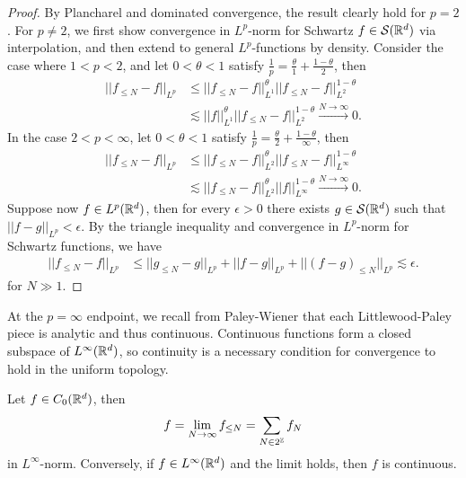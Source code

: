 \begin{proof}
	By Plancharel and dominated convergence, the result clearly hold for $p = 2$. For $p \neq 2$, we first show convergence in $L^p$-norm for Schwartz $f \in \mathcal S (\mathbb R^d)$ via interpolation, and then extend to general $L^p$-functions by density. Consider the case where $1 < p < 2$, and let $0 < \theta < 1$ satisfy $\tfrac1p = \tfrac{\theta}{1} + \tfrac{1 - \theta}{2}$, then 
		\begin{align*}
			 ||f_{\leq N} - f||_{L^p} 
					 	&\leq ||f_{\leq N} - f||_{L^1}^\theta ||f_{\leq N} - f||_{L^2}^{1 - \theta}\\
					 	& \lesssim ||f||^\theta_{L^1}||f_{\leq N} - f||_{L^2}^{1 - \theta} \overset{N \to \infty}{\longrightarrow} 0. 
		\end{align*}
	In the case $2 < p < \infty$, let $0 < \theta < 1$ satisfy $\tfrac1p = \tfrac\theta2 + \tfrac{1 - \theta}{\infty}$, then 
				\begin{align*}
					 ||f_{\leq N} - f||_{L^p} 
					 	&\leq ||f_{\leq N} - f||_{L^2}^\theta ||f_{\leq N} - f||_{L^\infty}^{1 - \theta}\\
					 	& \lesssim ||f_{\leq N} - f||_{L^2}^{\theta}   ||f||^{1 - \theta}_{L^\infty}\overset{N \to \infty}{\longrightarrow} 0. 
				\end{align*}	
	Suppose now $f \in L^p (\mathbb R^d)$, then for every $\epsilon > 0$ there exists $g \in \mathcal S (\mathbb R^d)$ such that $||f - g||_{L^p} < \epsilon$. By the triangle inequality and convergence in $L^p$-norm for Schwartz functions, we have 
		\begin{align*}
			||f_{\leq N} - f ||_{L^p} 								&\leq || g_{\leq N} - g||_{L^p} + ||f - g||_{L^p} + ||(f - g)_{\leq N}||_{L^p}\lesssim \epsilon.
		\end{align*}		
	for $N \gg 1$. 	
\end{proof}

At the $p = \infty$ endpoint, we recall from Paley-Wiener that each Littlewood-Paley piece is analytic and thus continuous. Continuous functions form a closed subspace of $L^\infty (\mathbb R^d)$, so continuity is a necessary condition for convergence to hold in the uniform topology. 

\begin{proposition}
	Let $f \in C_0 (\mathbb R^d)$, then
		\[ f = \lim_{N \to \infty} f_{\leq N} = \sum_{N \in 2^\mathbb Z} f_N \]
	in $L^\infty$-norm. Conversely, if $f \in L^\infty (\mathbb R^d)$ and the limit holds, then $f$ is continuous. \label{prop:inftyconv}
\end{proposition}

